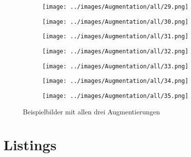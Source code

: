 \begin{figure}[H]
\begin{subfigure}[b]{0.1\textwidth}
\centering
\texttt{[image: ../images/Augmentation/all/29.png]}
\end{subfigure}
\hspace{1em}%
\begin{subfigure}[b]{0.1\textwidth}
\centering
\texttt{[image: ../images/Augmentation/all/30.png]}
\end{subfigure}
\hspace{1em}%
\begin{subfigure}[b]{0.1\textwidth}
\centering
\texttt{[image: ../images/Augmentation/all/31.png]}
\end{subfigure}
\hspace{1em}%
\begin{subfigure}[b]{0.1\textwidth}
\centering
\texttt{[image: ../images/Augmentation/all/32.png]}
\end{subfigure}
\hspace{1em}%
\begin{subfigure}[b]{0.1\textwidth}
\centering
\texttt{[image: ../images/Augmentation/all/33.png]}
\end{subfigure}
\hspace{1em}%
\begin{subfigure}[b]{0.1\textwidth}
\centering
\texttt{[image: ../images/Augmentation/all/34.png]}
\end{subfigure}
\hspace{1em}%
\begin{subfigure}[b]{0.1\textwidth}
\centering
\texttt{[image: ../images/Augmentation/all/35.png]}
\end{subfigure}
\caption{Beispielbilder mit allen drei Augmentierungen}
\label{fig:full-augmentation-imgs}
\end{figure}


\chapter*{Listings}

